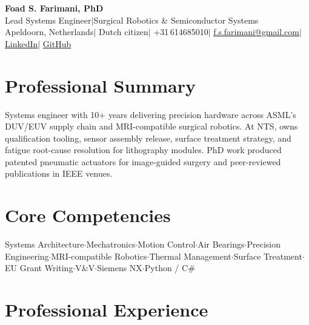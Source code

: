 \documentclass[10pt,a4paper]{article}
\begin{document}
\begin{center}
 {\LARGE\bfseries Foad S. Farimani, PhD} \\[3pt]
 {\small Lead Systems Engineer\enspace$\mid$\enspace Surgical Robotics \& Semiconductor Systems}
 \\[3pt]
 {\footnotesize
  Apeldoorn, Netherlands\enspace$\mid$\enspace
  Dutch citizen\enspace$\mid$\enspace
  +31\,614685010\enspace$\mid$\enspace
  \href{mailto:f.s.farimani@gmail.com}{f.s.farimani@gmail.com}\enspace$\mid$\enspace
  \href{https://linkedin.com/in/fsfarimani}{LinkedIn}\enspace$\mid$\enspace
  \href{https://github.com/Foadsf}{GitHub}
 }
\end{center}

\section{Professional Summary}
Systems engineer with 10+ years delivering precision hardware across ASML's DUV/EUV supply chain and MRI-compatible surgical robotics. At NTS, owns qualification tooling, sensor assembly release, surface treatment strategy, and fatigue root-cause resolution for lithography modules. PhD work produced patented pneumatic actuators for image-guided surgery and peer-reviewed publications in IEEE venues.

\section{Core Competencies}
\begin{center}
\small Systems Architecture\enspace$\cdot$\enspace Mechatronics\enspace$\cdot$\enspace Motion Control\enspace$\cdot$\enspace Air Bearings\enspace$\cdot$\enspace Precision Engineering\enspace$\cdot$\enspace MRI-compatible Robotics\enspace$\cdot$\enspace Thermal Management\enspace$\cdot$\enspace Surface Treatment\enspace$\cdot$\enspace EU Grant Writing\enspace$\cdot$\enspace V\&V\enspace$\cdot$\enspace Siemens NX\enspace$\cdot$\enspace Python / C\#
\end{center}

\section{Professional Experience}
\end{document}
